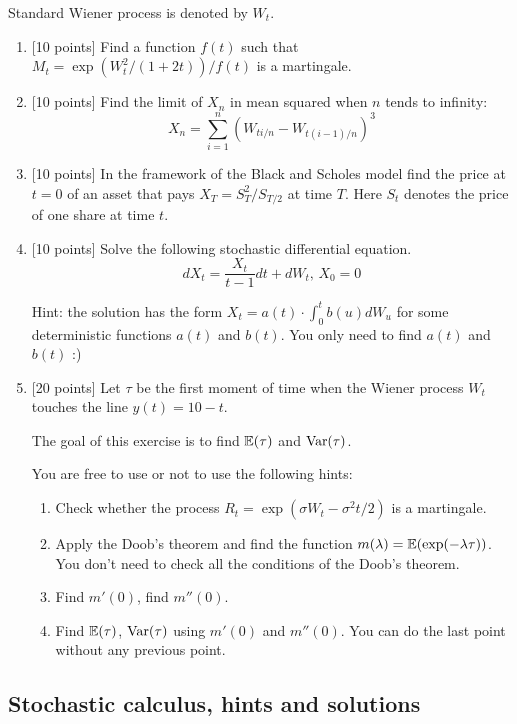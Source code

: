 \documentclass[12pt, a4paper]{article}
\begin{document}
Standard Wiener process is denoted by $W_t$.

\begin{enumerate}
  \item {[10 points]} Find a function $f(t)$ such that $M_t = \exp(W_t^2 / (1+2t)) / f(t)$ is a martingale.
  \item {[10 points]} Find the limit of $X_n$ in mean squared when $n$ tends to infinity:
  \[
  X_n =  \sum_{i=1}^n (W_{ti/n} - W_{t(i-1)/n})^3  
  \]
  
  \item {[10 points]} In the framework of the Black and Scholes model find the price at $t=0$ of an asset 
  that pays $X_T = S_T^2/S_{T/2}$ at time $T$. 
  Here $S_t$ denotes the price of one share at time $t$.

  \item {[10 points]} Solve the following stochastic differential equation.
  \[
  dX_t = \frac{X_t}{t-1} dt +  dW_t, \, X_0 = 0
  \] 
  
  Hint: the solution has the form $X_t = a(t) \cdot \int_0^t b(u) dW_u$ for some deterministic functions $a(t)$ and $b(t)$.
You only need to find $a(t)$ and $b(t)$ :)

  \item {[20 points]} Let $\tau$ be the first moment of time 
  when the Wiener process $W_t$ touches the line $y(t) = 10 - t$. 
  
The goal of this exercise is to find $\mathbb{E}(\tau)$ and $\operatorname{Var}(\tau)$. 

You are free to use or not to use the following hints:

  \begin{enumerate}
    \item Check whether the process $R_t = \exp(\sigma W_t - \sigma^2 t/2)$ is a martingale. 
    \item Apply the Doob's theorem and find the function $m(\lambda) = \mathbb{E}(\exp(-\lambda \tau))$. 
    You don't need to check all the conditions of the Doob's theorem. 
    \item Find $m'(0)$, find $m''(0)$.
    \item Find $\mathbb{E}(\tau)$, $\operatorname{Var}(\tau)$ using $m'(0)$ and $m''(0)$. You can do the last point without any previous point. 
  \end{enumerate}




\end{enumerate}


\subsection{Stochastic calculus, hints and solutions}
\end{document}
